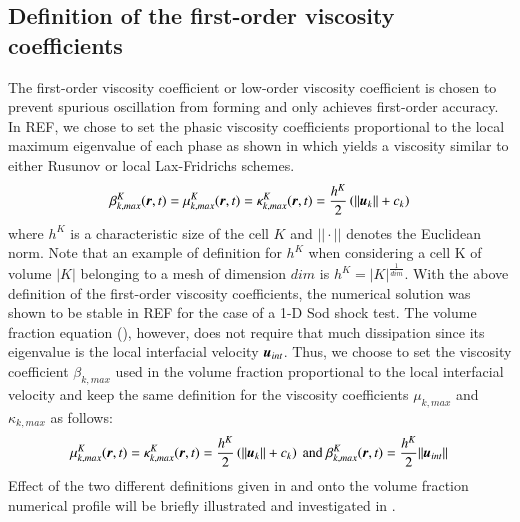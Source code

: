 \documentclass[preprint,10pt]{elsarticle}
\begin{document}
\subsection{Definition of the first-order viscosity coefficients}\label{sec:visc-coeff-fo}
%
The first-order viscosity coefficient or low-order viscosity coefficient is chosen to prevent spurious oscillation from forming and only achieves first-order accuracy. In REF, we chose to set the phasic viscosity coefficients proportional to the local maximum eigenvalue of each phase as shown in  which yields a viscosity similar to either Rusunov or local Lax-Fridrichs schemes.
%
\begin{equation}\label{eq:visc-coeff-fo-def-1}
\beta^K_{k,max}(\boldsymbol r,t) = \mu^K_{k,max}(\boldsymbol r,t) = \kappa^K_{k,max}(\boldsymbol r,t) = \frac{h^K}{2} \left( || \boldsymbol u_k || + c_k \right)
\end{equation}
%
where $h^K$ is a characteristic size of the cell $K$ and $|| \cdot ||$ denotes the Euclidean norm. Note that an example of definition for $h^K$ when considering a cell K of volume $|K|$ belonging to a mesh of dimension $dim$ is $h^K = |K|^\frac{1}{dim}$. With the above definition of the first-order viscosity coefficients, the numerical solution was shown to be stable in REF for the case of a 1-D Sod shock test. The volume fraction equation (), however, does not require that much dissipation since its eigenvalue is the local interfacial velocity $\boldsymbol u_{int}$. Thus, we choose to set the viscosity coefficient $\beta_{k,max}$ used in the volume fraction proportional to the local interfacial velocity and keep the same definition for the viscosity coefficients $\mu_{k,max}$ and $\kappa_{k,max}$ as follows:
%
\begin{equation}\label{eq:visc-coeff-fo-def-2}
\mu^K_{k,max}(\boldsymbol r,t) = \kappa^K_{k,max}(\boldsymbol r,t) = \frac{h^K}{2} \left( || \boldsymbol u_k || + c_k \right) \text{ and } \beta^K_{k,max}(\boldsymbol r,t) = \frac{h^K}{2} || \boldsymbol u_{int} ||
\end{equation}
%
Effect of the two different definitions given in  and  onto the volume fraction numerical profile will be briefly illustrated and investigated in .
%
\end{document}
